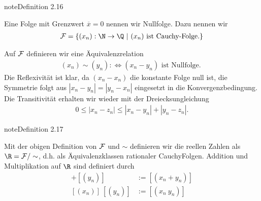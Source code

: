 \documentclass[letterpaper,10pt,english]{jupyterBook}
\begin{document}
\label{grundlagen/zahlensysteme:definition-17}
\begin{sphinxadmonition}{note}{Definition 2.16}



Eine Folge mit Grenzwert \(\overline{x}=0\) nennen wir Nullfolge. Dazu nennen wir
\begin{equation*}
\begin{split} {\cal F} = \{ (x_n): \N \rightarrow \Q~|~(x_n) \text{ ist Cauchy-Folge.}\}\end{split}
\end{equation*}\end{sphinxadmonition}

Auf \({\cal F}\) definieren wir eine Äquivalenzrelation
\begin{equation*}
\begin{split} (x_n) \sim (y_n) : \Leftrightarrow (x_n-y_n) \text{ ist Nullfolge. }\end{split}
\end{equation*}
Die Reflexivität ist klar, da \((x_n-x_n)\) die konstante Folge null ist, die Symmetrie folgt aus \(|x_n-y_n|=|y_n-x_n|\) eingesetzt in die Konvergenzbedingung. Die Transitivität erhalten wir wieder mit der Dreiecksungleichung
\begin{equation*}
\begin{split} 0 \leq  |x_n - z_n| \leq |x_n-y_n| + |y_n - z_n|.\end{split}
\end{equation*}\label{grundlagen/zahlensysteme:definition-18}
\begin{sphinxadmonition}{note}{Definition 2.17}



Mit der obigen Definition von \({\cal F}\) und \(\sim\) definieren wir die reellen Zahlen als \(\R = {\cal F}/\sim\), d.h. als Äquivalenzklassen rationaler Cauchy\sphinxhyphen{}Folgen.
Addition und Multiplikation auf \(\R\) sind definiert durch
\begin{align*}
[(x_n)] + [(y_n)] &:= [(x_n+y_n)] \\
[(x_n)] ~ [(y_n)] &:= [(x_n~y_n)]\end{align*}\end{sphinxadmonition}
\end{document}
